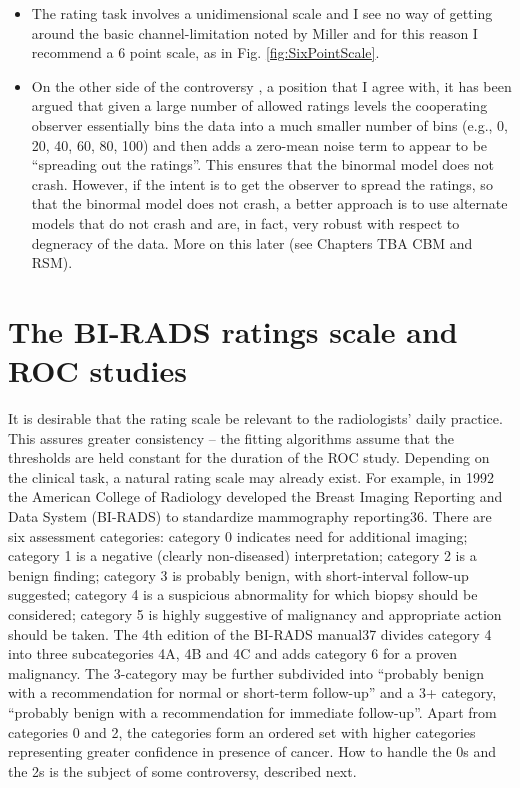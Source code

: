 \documentclass[
]{book}
\begin{document}
\begin{itemize}
\item
  The rating task involves a unidimensional scale and I see no way of getting around the basic channel-limitation noted by Miller and for this reason I recommend a 6 point scale, as in Fig. \ref{fig:SixPointScale}.
\item
  On the other side of the controversy \citep{RN2145}, a position that I agree with, it has been argued that given a large number of allowed ratings levels the cooperating observer essentially bins the data into a much smaller number of bins (e.g., 0, 20, 40, 60, 80, 100) and then adds a zero-mean noise term to appear to be ``spreading out the ratings''. This ensures that the binormal model does not crash. However, if the intent is to get the observer to spread the ratings, so that the binormal model does not crash, a better approach is to use alternate models that do not crash and are, in fact, very robust with respect to degneracy of the data. More on this later (see Chapters TBA CBM and RSM).
\end{itemize}

\hypertarget{binary-task-birads-rating-scale}{%
\section{The BI-RADS ratings scale and ROC studies}\label{binary-task-birads-rating-scale}}

It is desirable that the rating scale be relevant to the radiologists' daily practice. This assures greater consistency -- the fitting algorithms assume that the thresholds are held constant for the duration of the ROC study. Depending on the clinical task, a natural rating scale may already exist. For example, in 1992 the American College of Radiology developed the Breast Imaging Reporting and Data System (BI-RADS) to standardize mammography reporting36. There are six assessment categories: category 0 indicates need for additional imaging; category 1 is a negative (clearly non-diseased) interpretation; category 2 is a benign finding; category 3 is probably benign, with short-interval follow-up suggested; category 4 is a suspicious abnormality for which biopsy should be considered; category 5 is highly suggestive of malignancy and appropriate action should be taken. The 4th edition of the BI-RADS manual37 divides category 4 into three subcategories 4A, 4B and 4C and adds category 6 for a proven malignancy. The 3-category may be further subdivided into ``probably benign with a recommendation for normal or short-term follow-up'' and a 3+ category, ``probably benign with a recommendation for immediate follow-up''. Apart from categories 0 and 2, the categories form an ordered set with higher categories representing greater confidence in presence of cancer. How to handle the 0s and the 2s is the subject of some controversy, described next.
\end{document}

